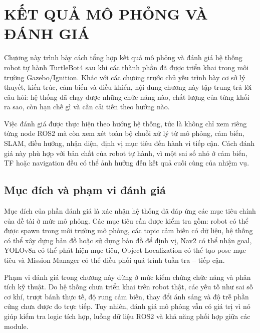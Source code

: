 \providecommand{\placeholderfigure}[3]{%
    \begin{figure}[H]
        \centering
        \fbox{%
            \parbox[c][4.0cm][c]{0.88\textwidth}{%
                \centering
                \textit{#1}%
            }%
        }
        \caption{#2}
        \label{#3}
    \end{figure}
}

\section{KẾT QUẢ MÔ PHỎNG VÀ ĐÁNH GIÁ}
\label{sec:simulation-results-evaluation}

Chương này trình bày cách tổng hợp kết quả mô phỏng và đánh giá hệ thống robot tự hành TurtleBot4 sau khi các thành phần đã được triển khai trong môi trường Gazebo/Ignition. Khác với các chương trước chủ yếu trình bày cơ sở lý thuyết, kiến trúc, cảm biến và điều khiển, nội dung chương này tập trung trả lời câu hỏi: hệ thống đã chạy được những chức năng nào, chất lượng của từng khối ra sao, còn hạn chế gì và cần cải tiến theo hướng nào.

Việc đánh giá được thực hiện theo hướng hệ thống, tức là không chỉ xem riêng từng node ROS2 mà còn xem xét toàn bộ chuỗi xử lý từ mô phỏng, cảm biến, SLAM, điều hướng, nhận diện, định vị mục tiêu đến hành vi tiếp cận. Cách đánh giá này phù hợp với bản chất của robot tự hành, vì một sai số nhỏ ở cảm biến, TF hoặc navigation đều có thể ảnh hưởng đến kết quả cuối cùng của nhiệm vụ.

\subsection{Mục đích và phạm vi đánh giá}
\label{subsec:evaluation-purpose-scope}

Mục đích của phần đánh giá là xác nhận hệ thống đã đáp ứng các mục tiêu chính của đề tài ở mức mô phỏng. Các mục tiêu cần được kiểm tra gồm: robot có thể được spawn trong môi trường mô phỏng, các topic cảm biến có dữ liệu, hệ thống có thể xây dựng bản đồ hoặc sử dụng bản đồ để định vị, Nav2 có thể nhận goal, YOLOv8n có thể phát hiện mục tiêu, Object Localization có thể tạo pose mục tiêu và Mission Manager có thể điều phối quá trình tuần tra -- tiếp cận.

Phạm vi đánh giá trong chương này dừng ở mức kiểm chứng chức năng và phân tích kỹ thuật. Do hệ thống chưa triển khai trên robot thật, các yếu tố như sai số cơ khí, trượt bánh thực tế, độ rung cảm biến, thay đổi ánh sáng và độ trễ phần cứng chưa được đo trực tiếp. Tuy nhiên, đánh giá mô phỏng vẫn có giá trị vì nó giúp kiểm tra logic tích hợp, luồng dữ liệu ROS2 và khả năng phối hợp giữa các module.

